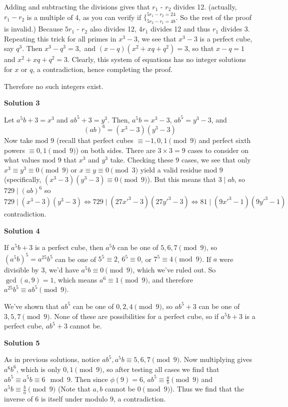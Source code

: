 \begin{enumerate}
 Adding and subtracting the divisions gives that $r_1$ - $r_2$ divides 12. (actually, $r_1 - r_2$ is a multiple of 4, as you can verify if $\{^{5r_1 - r_2 = 24}_{5r_2 - r_1 = 48}$. So the rest of the proof is invalid.) Because $5r_1$ - $r_2$ also divides 12, $4r_1$ divides 12 and thus $r_1$ divides 3. Repeating this trick for all primes in $x^3 - 3$, we see that $x^3 - 3$ is a perfect cube, say $q^3$. Then $x^3 - q^3 = 3,$ and $(x-q)(x^2 + xq + q^2) = 3$, so that $x - q = 1$ and $x^2 + xq + q^2 = 3$. Clearly, this system of equations has no integer solutions for $x$ or $q$, a contradiction, hence completing the proof.

 Therefore no such integers exist.

 



\textbf{Solution 3}

Let $a^5b+3=x^3$ and $ab^5+3=y^3$. Then, $a^5b=x^3-3$, $ab^5=y^3-3$, and 
 \[(ab)^6=(x^3-3)(y^3-3)\]Now take $\text{mod }9$ (recall that perfect cubes $\equiv -1,0,1\pmod{9}$ and perfect sixth powers $\equiv 0,1\pmod{9}$) on both sides. There are $3\times 3=9$ cases to consider on what values $\text{mod }9$ that $x^3$ and $y^3$ take. Checking these $9$ cases, we see that only $x^3\equiv y^3\equiv 0\pmod{9}$ or $x\equiv y\equiv 0\pmod{3}$ yield a valid residue $\text{mod }9$ (specifically, $(x^3-3)(y^3-3)\equiv 0\pmod{9}$). But this means that $3\mid ab$, so $729\mid (ab)^6$ so 
 \[729\mid (x^3-3)(y^3-3)\iff 729\mid (27x'^3-3)(27y'^3-3)\iff 81\mid (9x'^3-1)(9y'^3-1)\] contradiction.

 



\textbf{Solution 4}

If $a^5b+3$ is a perfect cube, then $a^5b$ can be one of $5,6,7 \pmod 9$, so $(a^5b)^5 = a^{25} b^5$ can be one of $5^5 \equiv 2$, $6^5 \equiv 0$, or $7^5 \equiv 4 \pmod 9$. If $a$ were divisible by $3$, we'd have $a^5 b \equiv 0 \pmod 9$, which we've ruled out. So $\gcd(a,9) = 1$, which means $a^6 \equiv 1 \pmod 9$, and therefore $a^{25} b^5 \equiv ab^5 \pmod 9$.

 We've shown that $a b^5$ can be one of $0, 2, 4 \pmod 9$, so $ab^5 + 3$ can be one of $3, 5, 7 \pmod 9$. None of these are possibilities for a perfect cube, so if $a^5b+3$ is a perfect cube, $ab^5+3$ cannot be.

 



\textbf{Solution 5}

As in previous solutions, notice $ab^5,a^5b \equiv 5,6,7 \pmod 9$. Now multiplying gives $a^6b^6$, which is only $0,1 \pmod 9$, so after testing all cases we find that $ab^5\equiv a^5b \equiv 6 \mod 9$. Then since $\phi (9) = 6$, $ab^5\equiv \frac{a}{b}\pmod 9$ and $a^5b \equiv \frac{b}{a}\pmod 9$ (Note that $a,b$ cannot be $0\pmod 9$). Thus we find that the inverse of $6$ is itself under modulo $9$, a contradiction.


\end{enumerate}
